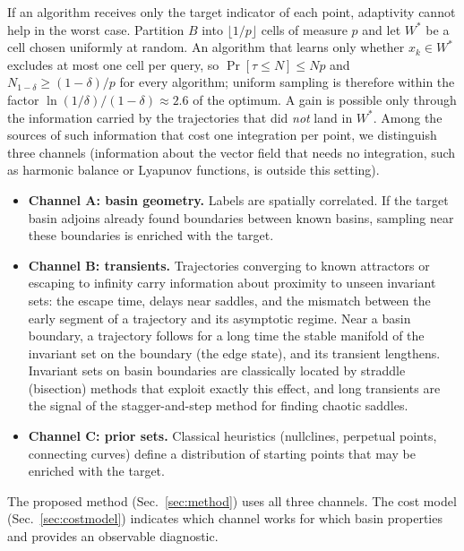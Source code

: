 If an algorithm receives only the target indicator of each point, adaptivity cannot help in the worst case. Partition $B$ into $\lfloor1/p\rfloor$ cells of measure $p$ and let $W^*$ be a cell chosen uniformly at random. An algorithm that learns only whether $x_k\in W^*$ excludes at most one cell per query, so $\Pr[\tau\le N]\le Np$ and $N_{1-\delta}\ge(1-\delta)/p$ for every algorithm; uniform sampling is therefore within the factor $\ln(1/\delta)/(1-\delta)\approx2.6$ of the optimum. A gain is possible only through the information carried by the trajectories that did \emph{not} land in $W^*$. Among the sources of such information that cost one integration per point, we distinguish three channels (information about the vector field that needs no integration, such as harmonic balance or Lyapunov functions, is outside this setting).
\begin{itemize}
\item \textbf{Channel A: basin geometry.} Labels are spatially correlated. If the target basin adjoins already found boundaries between known basins, sampling near these boundaries is enriched with the target.
\item \textbf{Channel B: transients.} Trajectories converging to known attractors or escaping to infinity carry information about proximity to unseen invariant sets: the escape time, delays near saddles, and the mismatch between the early segment of a trajectory and its asymptotic regime. Near a basin boundary, a trajectory follows for a long time the stable manifold of the invariant set on the boundary (the edge state\cite{Skufca2006Edge,Schneider2007Edge,Vollmer2009Edge}), and its transient lengthens. Invariant sets on basin boundaries are classically located by straddle (bisection) methods that exploit exactly this effect,\cite{NusseYorke1989} and long transients are the signal of the stagger-and-step method for finding chaotic saddles.\cite{SweetNusseYorke2001}
\item \textbf{Channel C: prior sets.} Classical heuristics (nullclines, perpetual points, connecting curves) define a distribution of starting points that may be enriched with the target.
\end{itemize}
The proposed method (Sec.~\ref{sec:method}) uses all three channels. The cost model (Sec.~\ref{sec:costmodel}) indicates which channel works for which basin properties and provides an observable diagnostic.
